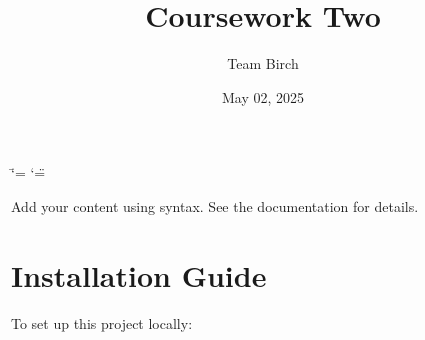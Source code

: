 \documentclass[letterpaper,10pt,english]{sphinxmanual}
\title{Coursework Two}
\date{May 02, 2025}
\author{Team Birch}
\begin{document}
\ifdefined\shorthandoff
  \ifnum\catcode`\=\string=\active\shorthandoff{=}\fi
  \ifnum\catcode`\"=\active{}\fi
\fi

\pagestyle{empty}
\sphinxmaketitle
\pagestyle{plain}
\sphinxtableofcontents
\pagestyle{normal}
\label{\detokenize{index::doc}}


\sphinxAtStartPar
Add your content using  syntax. See the
documentation for details.

\sphinxstepscope


\chapter{Installation Guide}
\label{\detokenize{installation_guide:installation-guide}}\label{\detokenize{installation_guide::doc}}
\sphinxAtStartPar
To set up this project locally:
\end{document}
